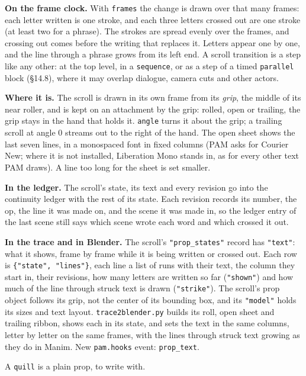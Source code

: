 \documentclass[
  12pt,
  letterpaper,
]{book}
\begin{document}
\textbf{On the frame clock.} With \texttt{frames} the change is drawn
over that many frames: each letter written is one stroke, and each
three letters crossed out are one stroke (at least two for a phrase).
The strokes are spread evenly over the frames, and crossing out comes
before the writing that replaces it. Letters appear one by one, and the
line through a phrase grows from its left end. A scroll transition is a
step like any other: at the top level, in a \texttt{sequence}, or as a
step of a timed \texttt{parallel} block (\S14.8), where it may overlap
dialogue, camera cuts and other actors.

\textbf{Where it is.} The scroll is drawn in its own frame from its
\emph{grip}, the middle of its near roller, and is kept on an
attachment by the grip: rolled, open or trailing, the grip stays in the
hand that holds it. \texttt{angle} turns it about the grip; a trailing
scroll at angle 0 streams out to the right of the hand. The open sheet
shows the last seven lines, in a monospaced font in fixed columns (PAM
asks for Courier New; where it is not installed, Liberation Mono stands
in, as for every other text PAM draws). A line too long for the sheet
is set smaller.

\textbf{In the ledger.} The scroll's state, its text and every
revision go into the continuity ledger with the rest of its state. Each
revision records its number, the op, the line it was made on, and the
scene it was made in, so the ledger entry of the last scene still says
which scene wrote each word and which crossed it out.

\textbf{In the trace and in Blender.} The scroll's
\texttt{"prop\_states"} record has \texttt{"text"}: what it shows,
frame by frame while it is being written or crossed out. Each row is
\texttt{\{"state",\ "lines"\}}, each line a list of runs with their
text, the column they start in, their revisions, how many letters are
written so far (\texttt{"shown"}) and how much of the line through
struck text is drawn (\texttt{"strike"}). The scroll's prop object
follows its grip, not the center of its bounding box, and its
\texttt{"model"} holds its sizes and text layout. \texttt{trace2blender.py}
builds its roll, open sheet and trailing ribbon, shows each in its
state, and sets the text in the same columns, letter by letter on the
same frames, with the lines through struck text growing as they do in
Manim. New \texttt{pam.hooks} event: \texttt{prop\_text}.

A \texttt{quill} is a plain prop, to write with.
\end{document}
